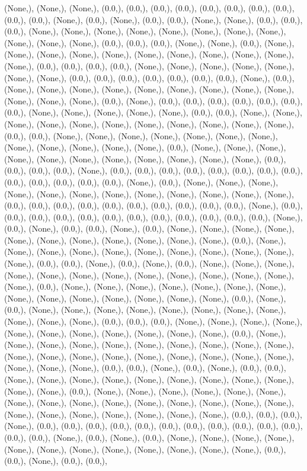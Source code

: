 \documentclass{article}
\begin{document}
(None,), (None,), (None,), (0.0,), (0.0,), (0.0,), (0.0,), (0.0,), (0.0,), (0.0,), (0.0,), (0.0,), (0.0,), (None,), (0.0,), (None,), (0.0,), (0.0,), (None,), (None,), (0.0,), (0.0,), (0.0,), (None,), (None,), (None,), (None,), (None,), (None,), (None,), (None,), (None,), (None,), (None,), (0.0,), (0.0,), (0.0,), (None,), (None,), (0.0,), (None,), (None,), (None,), (None,), (None,), (None,), (None,), (None,), (None,), (None,), (None,), (0.0,), (0.0,), (0.0,), (0.0,), (None,), (None,), (None,), (None,), (None,), (None,), (None,), (0.0,), (0.0,), (0.0,), (0.0,), (0.0,), (0.0,), (0.0,), (None,), (0.0,), (None,), (None,), (None,), (None,), (None,), (None,), (None,), (None,), (None,), (None,), (None,), (None,), (0.0,), (None,), (0.0,), (0.0,), (0.0,), (0.0,), (0.0,), (0.0,), (0.0,), (None,), (None,), (None,), (None,), (None,), (0.0,), (0.0,), (None,), (None,), (None,), (None,), (None,), (None,), (None,), (None,), (None,), (None,), (None,), (0.0,), (0.0,), (None,), (None,), (None,), (None,), (None,), (None,), (None,), (None,), (None,), (None,), (None,), (None,), (0.0,), (None,), (None,), (None,), (None,), (None,), (None,), (None,), (None,), (None,), (None,), (None,), (0.0,), (0.0,), (0.0,), (0.0,), (None,), (0.0,), (0.0,), (0.0,), (0.0,), (0.0,), (0.0,), (0.0,), (0.0,), (0.0,), (0.0,), (0.0,), (0.0,), (0.0,), (None,), (0.0,), (None,), (None,), (None,), (None,), (None,), (None,), (None,), (None,), (None,), (None,), (None,), (None,), (0.0,), (0.0,), (0.0,), (0.0,), (0.0,), (0.0,), (0.0,), (0.0,), (0.0,), (0.0,), (None,), (0.0,), (0.0,), (0.0,), (0.0,), (0.0,), (0.0,), (0.0,), (0.0,), (0.0,), (0.0,), (0.0,), (0.0,), (None,), (0.0,), (None,), (0.0,), (0.0,), (None,), (0.0,), (None,), (None,), (None,), (None,), (None,), (None,), (None,), (None,), (None,), (None,), (None,), (0.0,), (None,), (None,), (None,), (None,), (None,), (None,), (None,), (None,), (None,), (None,), (None,), (0.0,), (0.0,), (None,), (0.0,), (None,), (0.0,), (None,), (None,), (None,), (None,), (None,), (None,), (None,), (None,), (None,), (None,), (None,), (None,), (None,), (0.0,), (None,), (None,), (None,), (None,), (None,), (None,), (None,), (None,), (None,), (None,), (None,), (None,), (None,), (None,), (0.0,), (None,), (0.0,), (None,), (None,), (None,), (None,), (None,), (None,), (None,), (None,), (None,), (None,), (None,), (0.0,), (0.0,), (0.0,), (None,), (None,), (None,), (None,), (None,), (None,), (None,), (None,), (None,), (None,), (None,), (0.0,), (None,), (None,), (None,), (None,), (None,), (None,), (None,), (None,), (None,), (None,), (None,), (None,), (None,), (None,), (None,), (None,), (None,), (None,), (None,), (None,), (None,), (None,), (0.0,), (0.0,), (None,), (0.0,), (None,), (0.0,), (0.0,), (None,), (None,), (None,), (None,), (None,), (None,), (None,), (None,), (None,), (None,), (None,), (0.0,), (None,), (None,), (None,), (None,), (None,), (None,), (None,), (None,), (None,), (None,), (None,), (None,), (None,), (None,), (None,), (None,), (None,), (None,), (None,), (None,), (None,), (None,), (0.0,), (0.0,), (0.0,), (None,), (0.0,), (0.0,), (0.0,), (0.0,), (0.0,), (0.0,), (0.0,), (0.0,), (0.0,), (0.0,), (0.0,), (0.0,), (0.0,), (None,), (0.0,), (None,), (0.0,), (None,), (None,), (None,), (None,), (None,), (None,), (None,), (None,), (None,), (None,), (None,), (None,), (0.0,), (0.0,), (None,), (0.0,), (0.0,), 
\end{document}
